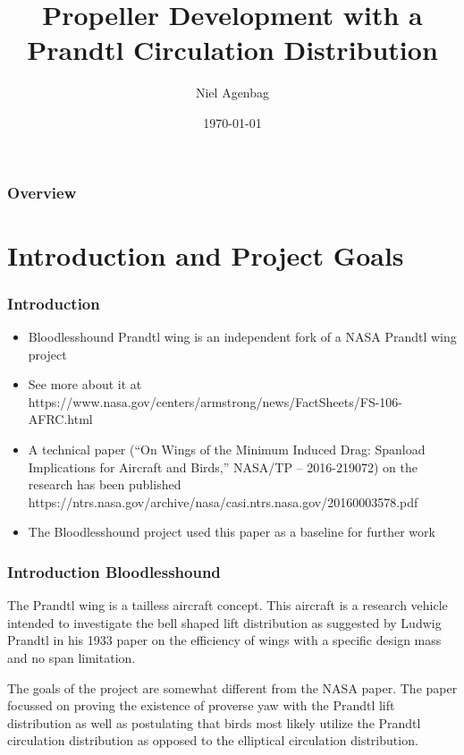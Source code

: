 \documentclass{beamer}
\title[Bloodlesshound]{Propeller Development with a Prandtl Circulation Distribution} %
\author{Niel Agenbag} %
\institute[Unaffiliated] %
{
Unaffiliated \\ %
\medskip
\textit{Ludwigprandtlwing@gmail.com} %
}
\date{\today} %
\begin{document}
\begin{frame}
\titlepage %
\end{frame}

\begin{frame}
\frametitle{Overview} %
\tableofcontents %
\end{frame}


\section{Introduction and Project Goals}

\begin{frame}
\frametitle{Introduction}
\begin{itemize}
\item Bloodlesshound Prandtl wing is an independent fork of a NASA Prandtl wing project
\item See more about it at https://www.nasa.gov/centers/armstrong/news/FactSheets/FS-106-AFRC.html
\item A technical paper (“On Wings of the Minimum Induced Drag: Spanload Implications for Aircraft and Birds,” NASA/TP – 2016-219072) on the research has been published
https://ntrs.nasa.gov/archive/nasa/casi.ntrs.nasa.gov/20160003578.pdf
\item The Bloodlesshound project used this paper as a baseline for further work
\end{itemize}
\end{frame}



\begin{frame}
\frametitle{Introduction Bloodlesshound}

The Prandtl wing is a tailless aircraft concept.  This aircraft is a research vehicle intended to investigate the bell shaped 
lift distribution as suggested by Ludwig Prandtl in his 1933 paper on the efficiency of wings with a specific design mass 
and no span limitation.

The goals of the project are somewhat different from the NASA paper.  The paper focussed on proving the existence of proverse yaw with the Prandtl lift distribution as well as postulating that birds most likely utilize the Prandtl circulation distribution as opposed to the elliptical circulation distribution.  

\end{frame}
\end{document}
